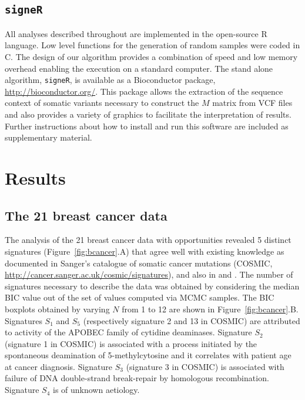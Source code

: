 \documentclass{bioinfo}
\newcommand{\CC}{C\nolinebreak\hspace{-.05em}\raisebox{.4ex}{\tiny
    +}\nolinebreak\hspace{-.15em}\raisebox{.4ex}{\tiny +}}
\begin{document}
\subsection{\texttt{signeR}}
All analyses described throughout are implemented in the open-source R
language. Low level functions for the generation of random samples
were coded in \CC. The design of our algorithm provides a combination
of speed and low memory overhead enabling the execution on a standard
computer. The stand alone algorithm, \texttt{signeR}, is available as
a Bioconductor package, \url{http://bioconductor.org/}. This package
allows the extraction of the sequence context of somatic variants
necessary to construct the $M$ matrix from VCF files and also
provides a variety of graphics to facilitate the interpretation of
results. Further instructions about how to install and run this
software are included as supplementary material.

\section{Results}
\subsection{The 21 breast cancer data}
The analysis of the 21 breast cancer data with opportunities revealed
5 distinct signatures (Figure~\ref{fig:bcancer}.A) that agree well
with existing knowledge as documented in Sanger's catalogue of
somatic cancer mutations (COSMIC, 
\url{http://cancer.sanger.ac.uk/cosmic/signatures}), and also in
\cite{HEN} and \cite{ANat}. The number of signatures necessary to
describe the data was obtained by considering the median BIC value out
of the set of values computed via MCMC samples. The BIC boxplots
obtained by varying $N$ from 1 to 12 are shown in
Figure~\ref{fig:bcancer}.B. Signatures $S_1$ and $S_5$ (respectively
signature 2 and 13 in COSMIC) are attributed to activity of the APOBEC
family of cytidine deaminases.  Signature $S_2$ (signature 1 in
COSMIC) is associated with a process initiated by the spontaneous
deamination of 5-methylcytosine and it correlates with patient age at
cancer diagnosis. Signature $S_3$ (signature 3 in COSMIC) is
associated with failure of DNA double-strand break-repair by
homologous recombination. Signature $S_4$ is of unknown aetiology. 
\end{document}
